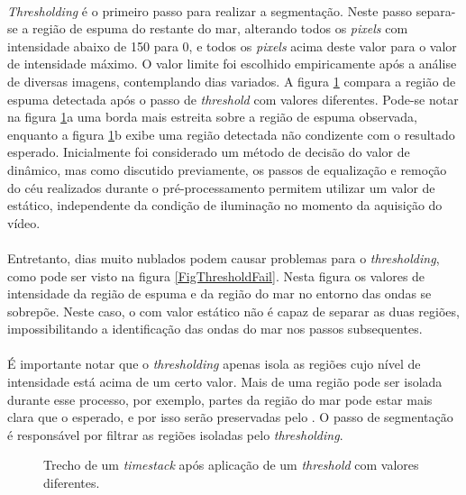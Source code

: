 \paragraph{}\textit{Thresholding} é o primeiro passo para realizar a segmentação. Neste passo separa-se a região de espuma do restante do mar, alterando todos os \textit{pixels} com intensidade abaixo de 150 para 0, e todos os \textit{pixels} acima deste valor para o valor de intensidade máximo. O valor limite foi escolhido empiricamente após a análise de diversas imagens, contemplando dias variados. A figura \ref{FigThreshold} compara a região de espuma detectada após o passo de \textit{threshold} com valores diferentes. Pode-se notar na figura \ref{FigThreshold}a uma borda mais estreita sobre a região de espuma observada, enquanto a figura \ref{FigThreshold}b exibe uma região detectada não condizente com o resultado esperado. Inicialmente foi considerado um método de decisão do valor de \threshold dinâmico, mas como discutido previamente, os passos de equalização e remoção do céu realizados durante o pré-processamento permitem utilizar um valor de \threshold estático, independente da condição de iluminação no momento da aquisição do vídeo. 

\paragraph{}Entretanto, dias muito nublados podem causar problemas para o \textit{thresholding}, como pode ser visto na figura \ref{FigThresholdFail}. Nesta figura os valores de intensidade da região de espuma e da região do mar no entorno das ondas se sobrepõe. Neste caso, o \threshold com valor estático não é capaz de separar as duas regiões, impossibilitando a identificação das ondas do mar nos passos subsequentes.

\paragraph{}É importante notar que o \textit{thresholding} apenas isola as regiões cujo nível de intensidade está acima de um certo valor. Mais de uma região pode ser isolada durante esse processo, por exemplo, partes da região do mar pode estar mais clara que o esperado, e por isso serão preservadas pelo \threshold. O passo de segmentação é responsável por filtrar as regiões isoladas pelo \textit{thresholding}.


\begin{figure}[h]
  \centering
  \qquad
  \caption[\small{Trecho de um \textit{timestack} após aplicação de um \textit{threshold} com valores diferentes.}]{\small{Trecho de um \textit{timestack} após aplicação de um \textit{threshold} com valores diferentes.}
  \label{FigThreshold}
}
\end{figure}

